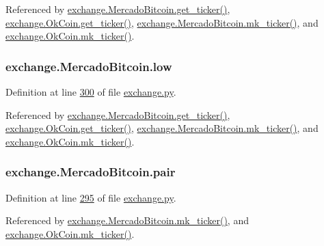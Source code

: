 Referenced by \hyperlink{exchange_8py_source_l00306}{exchange.\+Mercado\+Bitcoin.\+get\+\_\+ticker()}, \hyperlink{exchange_8py_source_l00371}{exchange.\+Ok\+Coin.\+get\+\_\+ticker()}, \hyperlink{exchange_8py_source_l00320}{exchange.\+Mercado\+Bitcoin.\+mk\+\_\+ticker()}, and \hyperlink{exchange_8py_source_l00385}{exchange.\+Ok\+Coin.\+mk\+\_\+ticker()}.

\subsubsection[{\texorpdfstring{low}{low}}]{\setlength{\rightskip}{0pt plus 5cm}exchange.\+Mercado\+Bitcoin.\+low}\hypertarget{classexchange_1_1_mercado_bitcoin_aaa3aae824bfc5ba3b7dc5252e9554713}{}\label{classexchange_1_1_mercado_bitcoin_aaa3aae824bfc5ba3b7dc5252e9554713}


Definition at line \hyperlink{exchange_8py_source_l00300}{300} of file \hyperlink{exchange_8py_source}{exchange.\+py}.



Referenced by \hyperlink{exchange_8py_source_l00306}{exchange.\+Mercado\+Bitcoin.\+get\+\_\+ticker()}, \hyperlink{exchange_8py_source_l00371}{exchange.\+Ok\+Coin.\+get\+\_\+ticker()}, \hyperlink{exchange_8py_source_l00320}{exchange.\+Mercado\+Bitcoin.\+mk\+\_\+ticker()}, and \hyperlink{exchange_8py_source_l00385}{exchange.\+Ok\+Coin.\+mk\+\_\+ticker()}.

\subsubsection[{\texorpdfstring{pair}{pair}}]{\setlength{\rightskip}{0pt plus 5cm}exchange.\+Mercado\+Bitcoin.\+pair}\hypertarget{classexchange_1_1_mercado_bitcoin_a879f8ca352d313230d72e6e8785985a1}{}\label{classexchange_1_1_mercado_bitcoin_a879f8ca352d313230d72e6e8785985a1}


Definition at line \hyperlink{exchange_8py_source_l00295}{295} of file \hyperlink{exchange_8py_source}{exchange.\+py}.



Referenced by \hyperlink{exchange_8py_source_l00320}{exchange.\+Mercado\+Bitcoin.\+mk\+\_\+ticker()}, and \hyperlink{exchange_8py_source_l00385}{exchange.\+Ok\+Coin.\+mk\+\_\+ticker()}.

